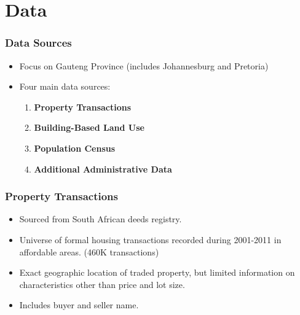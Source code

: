\documentclass[aspectratio=149]{beamer}
\begin{document}
\section{Data}


\begin{frame}
\frametitle{Data Sources}

\begin{itemize}
  \item Focus on Gauteng Province (includes Johannesburg and Pretoria)

  \vspace{2mm}

  \item<2-> Four main data sources:
  \vspace{2mm}
  \begin{enumerate}
    \item \textbf{Property Transactions} 
    \vspace{2mm}
    \item \textbf{Building-Based Land Use}
    \vspace{2mm}
    \item \textbf{Population Census} 
    \vspace{2mm}
    \item \textbf{Additional Administrative Data} 
  \end{enumerate}

\end{itemize}

\end{frame}


\begin{frame}
\frametitle{Property Transactions}

\begin{itemize}

  \item Sourced from South African deeds registry. 
  \vspace{2mm}
  \item Universe of formal housing transactions recorded during 2001-2011 in
affordable areas. (460K transactions)
  \vspace{2mm}
  \item Exact geographic location of traded property, but limited information
on characteristics other than price and lot size.
  \vspace{2mm}
  \item Includes buyer and seller name.
\end{itemize}
\end{frame}
\end{document}
